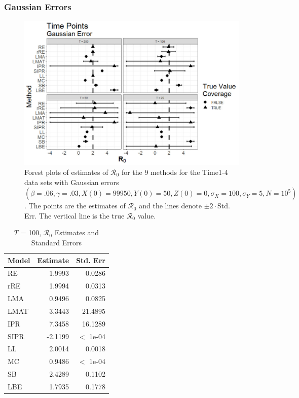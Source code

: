 \documentclass[12pt]{article}
\newcommand{\xxsir}{\ensuremath{9} } %
\newcommand{\rr}{\ensuremath{\mathcal{R}_0}}
\begin{document}
\subsubsection{Gaussian Errors}

\begin{figure}[H]
  \centering
  \includegraphics[scale=0.5]{images/time_n.jpg}
  \caption{Forest plots of estimates of $\rr$ for the \xxsir methods for the Time1-4 data sets with Gaussian errors $(\beta=.06, \gamma=.03, X(0)=99950, Y(0)=50, Z(0)=0, \sigma_X=100, \sigma_Y=5, N=10^5)$.  The points are the estimates of $\rr$ and the lines denote $\pm 2\cdot $Std. Err.  The vertical line is the true $\rr$ value.}\label{fig:time-res}
  \end{figure}


\begin{table}[H]
	

	\centering
	\begin{tabular}[t]{l|r|r}
		\hline
		Model & Estimate & Std. Err\\
		\hline
		RE & 1.9993 & 0.0286\\
		\hline
		rRE & 1.9994 & 0.0313\\
		\hline
		LMA & 0.9496 & 0.0825\\
		\hline
		LMAT & 3.3443 & 21.4895\\
		\hline
		IPR & 7.3458 & 16.1289\\
		\hline
		SIPR & -2.1199 & $<$ 1e-04\\
		\hline
		LL & 2.0014 & 0.0018\\
		\hline
		MC & 0.9486 & $<$ 1e-04\\
		\hline
		SB & 2.4289 & 0.1102\\
		\hline
		LBE & 1.7935 & 0.1778\\
		\hline
	\end{tabular}
        \caption{ $T$ = 100, $\rr$ Estimates and Standard Errors}\label{tab:time-res1}
\end{table}
\end{document}
